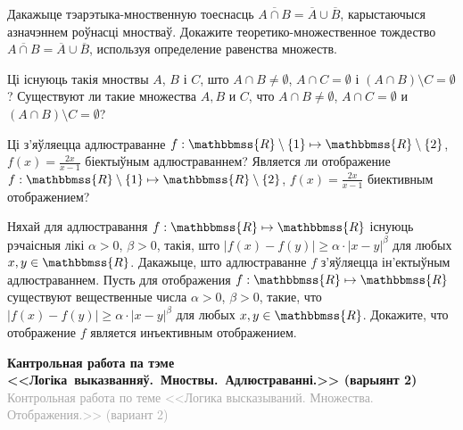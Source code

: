 \begin{problemList}
\problemItemSimple
{Дакажыце тэарэтыка-мноственную тоеснасць $\overline{A \cap B} = \overline{A} \cup \overline{B}$, карыстаючыся азначэннем роўнасці мностваў.}
{Докажите теоретико-множественное тождество $\overline{A \cap B} = \overline{A} \cup \overline{B}$, используя определение равенства множеств.}

\problemItemSimple
{Ці існуюць такія мноствы $A$, $B$ і $C$, што $A \cap B \neq \emptyset$, $A \cap C = \emptyset$ і $(A \cap B) \setminus C = \emptyset$?}
{Существуют ли такие множества $A, B$ и $C$, что $A \cap B \neq \emptyset$, $A \cap C = \emptyset$ и $(A \cap B) \setminus C = \emptyset$?}

\problemItemSimple
{Ці з'яўляецца адлюстраванне $f: \mathbbmss{R} \setminus \{1\} \mapsto \mathbbmss{R} \setminus \{2\}$, $f(x) = \frac{2 x}{x - 1}$ біектыўным адлюстраваннем?}
{Является ли отображение $f: \mathbbmss{R} \setminus \{1\} \mapsto \mathbbmss{R} \setminus \{2\}$, $f(x) = \frac{2 x}{x - 1}$ биективным отображением?}

\problemItemSimple
{Няхай для адлюстравання $f: \mathbbmss{R} \mapsto \mathbbmss{R}$ існуюць рэчаісныя лікі $\alpha > 0$, $\beta > 0$, такія, што $|f(x) - f(y)| \geq \alpha \cdot |x - y|^{\beta}$ для любых $x, y \in \mathbbmss{R}$. Дакажыце, што адлюстраванне $f$ з'яўляецца ін'ектыўным адлюстраваннем.}
{Пусть для отображения $f: \mathbbmss{R} \mapsto \mathbbmss{R}$ существуют вещественные числа $\alpha > 0$, $\beta > 0$, такие, что $|f(x) - f(y)| \geq \alpha \cdot |x - y|^{\beta}$ для любых $x, y \in \mathbbmss{R}$. Докажите, что отображение $f$ является инъективным отображением.}

\end{problemList}

\newpage

\begin{center}
	\textbf{Кантрольная работа па тэме <<Логіка~выказванняў.~Мноствы.~Адлюстраванні.>> (варыянт 2)} \\
	{\small \textcolor{darkgray}{Контрольная работа по теме <<Логика высказываний. Множества. Отображения.>> (вариант 2)}}
\end{center}

